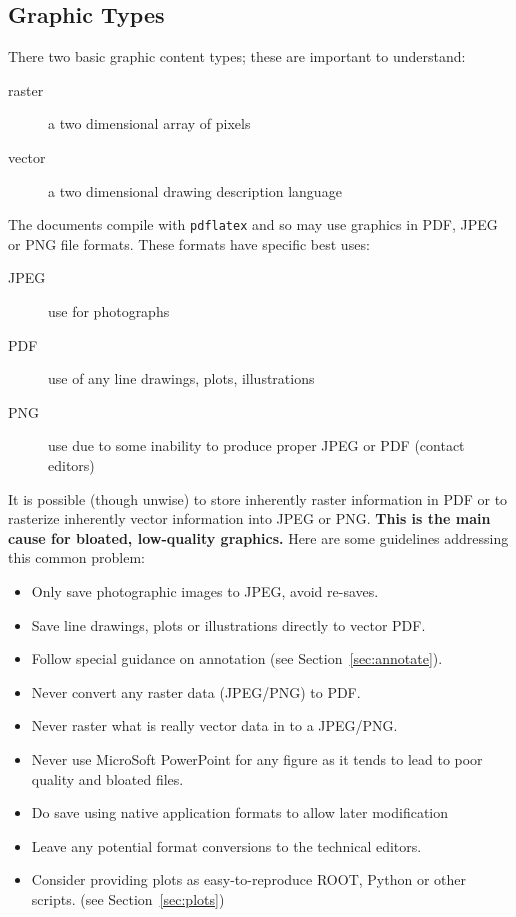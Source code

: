 \subsection{Graphic Types}
\label{sec:graphic-types}

There two basic graphic content types; these are important to understand:

\begin{description}
\item[raster] a two dimensional array of pixels
\item[vector] a two dimensional drawing description language
\end{description}

The documents compile with \texttt{pdflatex} and so may use graphics
in PDF, JPEG or PNG file formats.
These formats have specific best uses:

\begin{description}
\item[JPEG] use for photographs
\item[PDF] use of any line drawings, plots, illustrations
\item[PNG] use due to some inability to produce proper JPEG or PDF (contact editors)
\end{description}

It is possible (though unwise) to store inherently raster information
in PDF or to rasterize inherently vector information into JPEG or PNG.
\textbf{This is the main cause for bloated, low-quality graphics.}
Here are some guidelines addressing this common problem:

\begin{itemize}
\item Only save photographic images to JPEG, avoid re-saves.
\item Save line drawings, plots or illustrations directly to vector PDF.
\item Follow special guidance on annotation (see Section~\ref{sec:annotate}).
\item Never convert any raster data (JPEG/PNG) to PDF.
\item Never raster what is really vector data in to a JPEG/PNG.
\item Never use MicroSoft PowerPoint for any figure as it tends to lead to poor quality and bloated files.
\item Do save using native application formats to allow later
  modification
\item Leave any potential format conversions to the technical editors.
\item Consider providing plots as easy-to-reproduce ROOT, Python or
  other scripts.
  (see Section~\ref{sec:plots})
\end{itemize}


